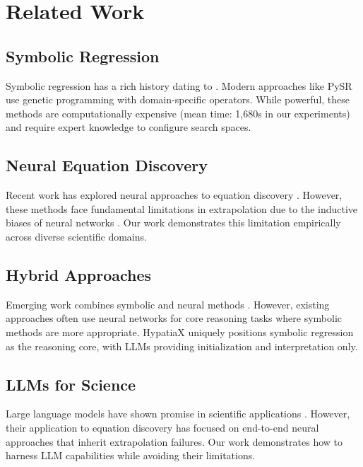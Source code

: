\documentclass[twoside,11pt]{article}
\begin{document}
\section{Related Work}
\label{sec:related}

\subsection{Symbolic Regression}

Symbolic regression has a rich history dating to \citet{koza1992genetic}. Modern approaches like PySR \citep{cranmer2023interpretable} use genetic programming with domain-specific operators. While powerful, these methods are computationally expensive (mean time: 1,680s in our experiments) and require expert knowledge to configure search spaces.

\subsection{Neural Equation Discovery}

Recent work has explored neural approaches to equation discovery \citep{udrescu2020ai, cranmer2020discovering}. However, these methods face fundamental limitations in extrapolation due to the inductive biases of neural networks \citep{xu2020neural}. Our work demonstrates this limitation empirically across diverse scientific domains.

\subsection{Hybrid Approaches}

Emerging work combines symbolic and neural methods \citep{chen2022symbolic, mondal2023symbolic}. However, existing approaches often use neural networks for core reasoning tasks where symbolic methods are more appropriate. HypatiaX uniquely positions symbolic regression as the reasoning core, with LLMs providing initialization and interpretation only.

\subsection{LLMs for Science}

Large language models have shown promise in scientific applications \citep{romera2024mathematical, lu2024ai}. However, their application to equation discovery has focused on end-to-end neural approaches that inherit extrapolation failures. Our work demonstrates how to harness LLM capabilities while avoiding their limitations.
\end{document}
